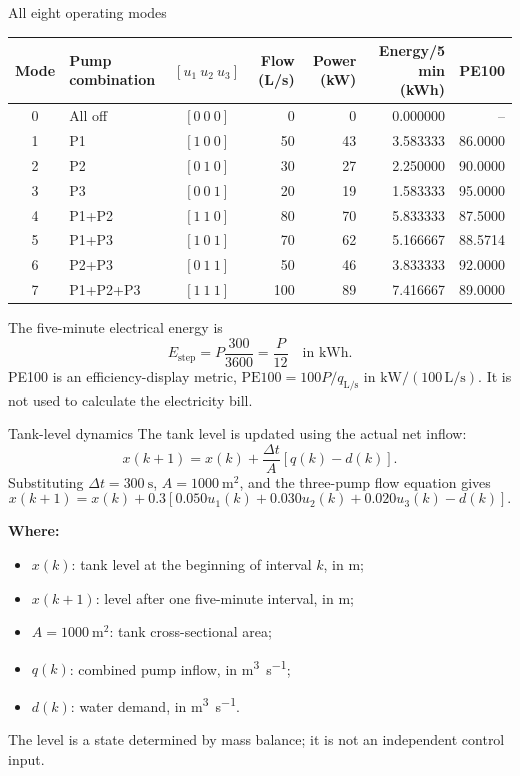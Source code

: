 \documentclass[t,12pt]{beamer}
\begin{document}
\begin{frame}{All eight operating modes}
\small
\begin{center}
\begin{tabular}{c l c r r r r}
\toprule
Mode & Pump combination & $[u_1\ u_2\ u_3]$ &
Flow (L/s) & Power (kW) & Energy/5 min (kWh) & PE100 \\
\midrule
0 & All off       & $[0\ 0\ 0]$ &   0 &  0 & 0.000000 & -- \\
1 & P1            & $[1\ 0\ 0]$ &  50 & 43 & 3.583333 & 86.0000 \\
2 & P2            & $[0\ 1\ 0]$ &  30 & 27 & 2.250000 & 90.0000 \\
3 & P3            & $[0\ 0\ 1]$ &  20 & 19 & 1.583333 & 95.0000 \\
4 & P1+P2         & $[1\ 1\ 0]$ &  80 & 70 & 5.833333 & 87.5000 \\
5 & P1+P3         & $[1\ 0\ 1]$ &  70 & 62 & 5.166667 & 88.5714 \\
6 & P2+P3         & $[0\ 1\ 1]$ &  50 & 46 & 3.833333 & 92.0000 \\
7 & P1+P2+P3      & $[1\ 1\ 1]$ & 100 & 89 & 7.416667 & 89.0000 \\
\bottomrule
\end{tabular}
\end{center}

\small
The five-minute electrical energy is
\[
  E_{\mathrm{step}}=P\frac{300}{3600}=\frac{P}{12}
  \quad\text{in kWh}.
\]
PE100 is an efficiency-display metric,
$\mathrm{PE100}=100P/q_{\mathrm{L/s}}$ in
$\mathrm{kW/(100\,L/s)}$.  It is \alert{not} used to calculate the
electricity bill.
\end{frame}

\begin{frame}{Tank-level dynamics}
The tank level is updated using the actual net inflow:
\[
  x(k+1)=x(k)+\frac{\Delta t}{A}\left[q(k)-d(k)\right].
\]
Substituting $\Delta t=\SI{300}{\second}$, $A=\SI{1000}{\metre\squared}$,
and the three-pump flow equation gives
\[
  x(k+1)=x(k)+0.3\left[
  0.050u_1(k)+0.030u_2(k)+0.020u_3(k)-d(k)\right].
\]

\textbf{Where:}
\begin{itemize}
  \item $x(k)$: tank level at the beginning of interval $k$, in \si{\metre};
  \item $x(k+1)$: level after one five-minute interval, in \si{\metre};
  \item $A=\SI{1000}{\metre\squared}$: tank cross-sectional area;
  \item $q(k)$: combined pump inflow, in \si{\metre\cubed\per\second};
  \item $d(k)$: water demand, in \si{\metre\cubed\per\second}.
\end{itemize}

The level is a state determined by mass balance; it is not an independent
control input.
\end{frame}
\end{document}
